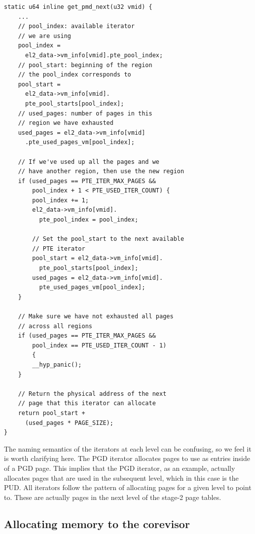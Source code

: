 \begin{verbatim}
static u64 inline get_pmd_next(u32 vmid) {
    ...
    // pool_index: available iterator
    // we are using
    pool_index =
      el2_data->vm_info[vmid].pte_pool_index;
    // pool_start: beginning of the region
    // the pool_index corresponds to
    pool_start =
      el2_data->vm_info[vmid].
      pte_pool_starts[pool_index];
    // used_pages: number of pages in this
    // region we have exhausted
    used_pages = el2_data->vm_info[vmid]
      .pte_used_pages_vm[pool_index];

    // If we've used up all the pages and we
    // have another region, then use the new region
    if (used_pages == PTE_ITER_MAX_PAGES &&
        pool_index + 1 < PTE_USED_ITER_COUNT) {
        pool_index += 1;
        el2_data->vm_info[vmid].
          pte_pool_index = pool_index;

        // Set the pool_start to the next available
        // PTE iterator
        pool_start = el2_data->vm_info[vmid].
          pte_pool_starts[pool_index];
        used_pages = el2_data->vm_info[vmid].
          pte_used_pages_vm[pool_index];
    }

    // Make sure we have not exhausted all pages
    // across all regions
    if (used_pages == PTE_ITER_MAX_PAGES &&
        pool_index == PTE_USED_ITER_COUNT - 1)
        {
        __hyp_panic();
    }

    // Return the physical address of the next
    // page that this iterator can allocate
    return pool_start +
      (used_pages * PAGE_SIZE);
}
\end{verbatim}

The naming semantics of the iterators at each level can be confusing, so we feel it is worth
clarifying here. The PGD iterator allocates pages to use as entries inside of a PGD page. This
implies that the PGD iterator, as an example, actually allocates pages that are used in the
subsequent level, which in this case is the PUD. All iterators follow the pattern of allocating
pages for a given level to point to. These are actually pages in the next level
of the stage-2 page tables.

\subsection{Allocating memory to the corevisor}

